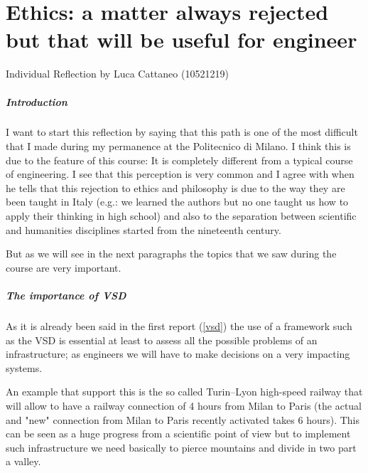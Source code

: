 \chapter{Ethics: a matter always rejected but that will be useful for engineer}

\begin{flushright}
Individual Reflection by Luca Cattaneo (10521219)
\end{flushright} 

%
%
%
%
%

\paragraph{Introduction}
I want to start this reflection by saying that this path is one of the most difficult that I made during my permanence at the Politecnico di Milano. I think this is due to the feature of this course: It is completely different from a typical course of engineering. I see that this perception is very common and I agree with \cite{eticatrasporti} when he tells that this rejection to ethics and philosophy is due to the way they are been taught in Italy (e.g.: we learned the authors but no one taught us how to apply their thinking in high school) and also to the separation between scientific and humanities disciplines started from the nineteenth century.

But as we will see in the next paragraphs the topics that we saw during the course are very important.  

\paragraph{The importance of VSD}
As it is already been said in the first report (\ref{vsd}) the use of a framework such as the VSD is essential at least to assess all the possible problems of an infrastructure; as engineers we will have to make decisions on a very impacting systems.

An example that support this is the so called Turin–Lyon high-speed railway that will allow to have a railway connection of 4 hours from Milan to Paris (the actual and "new" connection from Milan to Paris recently activated takes 6 hours). This can be seen as a huge progress from a scientific point of view but to implement such infrastructure we need basically to pierce mountains and divide in two part a valley.

